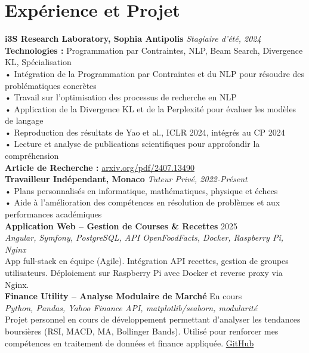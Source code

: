 \documentclass[a4paper,10pt]{article}
\begin{document}
\section*{Expérience et Projet}
\textbf{i3S Research Laboratory, Sophia Antipolis} \hfill \textit{Stagiaire d'été, 2024}\\
\textbf{Technologies :} Programmation par Contraintes, NLP, Beam Search, Divergence KL, Spécialisation\\
• Intégration de la Programmation par Contraintes et du NLP pour résoudre des problématiques concrètes\\
• Travail sur l’optimisation des processus de recherche en NLP\\
• Application de la Divergence KL et de la Perplexité pour évaluer les modèles de langage\\
• Reproduction des résultats de Yao et al., ICLR 2024, intégrés au CP 2024\\
• Lecture et analyse de publications scientifiques pour approfondir la compréhension\\
\textbf{Article de Recherche :} \href{https://arxiv.org/pdf/2407.13490}{arxiv.org/pdf/2407.13490}\\
\textbf{Travailleur Indépendant, Monaco} \hfill \textit{Tuteur Privé, 2022-Présent}\\
• Plans personnalisés en informatique, mathématiques, physique et échecs\\
• Aide à l’amélioration des compétences en résolution de problèmes et aux performances académiques\\
\textbf{Application Web – Gestion de Courses \& Recettes} \hfill 2025 \\
\textit{Angular, Symfony, PostgreSQL, API OpenFoodFacts, Docker, Raspberry Pi, Nginx} \\
App full-stack en équipe (Agile). Intégration API recettes, gestion de groupes utilisateurs. Déploiement sur Raspberry Pi avec Docker et reverse proxy via Nginx.\\
\textbf{Finance Utility – Analyse Modulaire de Marché} \hfill En cours \\
\textit{Python, Pandas, Yahoo Finance API, matplotlib/seaborn, modularité} \\
Projet personnel en cours de développement permettant d’analyser les tendances boursières (RSI, MACD, MA, Bollinger Bands). Utilisé pour renforcer mes compétences en traitement de données et finance appliquée. \href{https://github.com/TerminalGambit/PersonalStockTrackerAnalyser}{GitHub} \\
\end{document}
